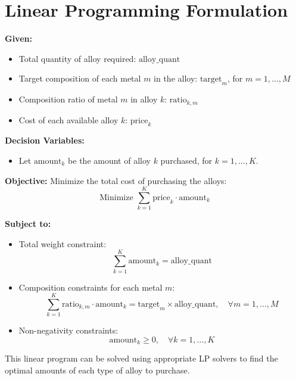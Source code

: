 \documentclass{article}
\begin{document}
\section*{Linear Programming Formulation}

\textbf{Given:}
\begin{itemize}
    \item Total quantity of alloy required: \( \text{alloy\_quant} \)
    \item Target composition of each metal \( m \) in the alloy: \(\text{target}_m\), for \( m = 1, \ldots, M \)
    \item Composition ratio of metal \( m \) in alloy \( k \): \(\text{ratio}_{k, m}\)
    \item Cost of each available alloy \( k \): \(\text{price}_k\)
\end{itemize}

\textbf{Decision Variables:}
\begin{itemize}
    \item Let \( \text{amount}_k \) be the amount of alloy \( k \) purchased, for \( k = 1, \ldots, K \).
\end{itemize}

\textbf{Objective:}
Minimize the total cost of purchasing the alloys:
\[
\text{Minimize } \sum_{k=1}^{K} \text{price}_k \cdot \text{amount}_k
\]

\textbf{Subject to:}
\begin{itemize}
    \item Total weight constraint:
    \[
    \sum_{k=1}^{K} \text{amount}_k = \text{alloy\_quant}
    \]
    \item Composition constraints for each metal \( m \):
    \[
    \sum_{k=1}^{K} \text{ratio}_{k, m} \cdot \text{amount}_k = \text{target}_m \times \text{alloy\_quant}, \quad \forall m = 1, \ldots, M
    \]
    \item Non-negativity constraints:
    \[
    \text{amount}_k \geq 0, \quad \forall k = 1, \ldots, K
    \]
\end{itemize}

This linear program can be solved using appropriate LP solvers to find the optimal amounts of each type of alloy to purchase.
\end{document}
